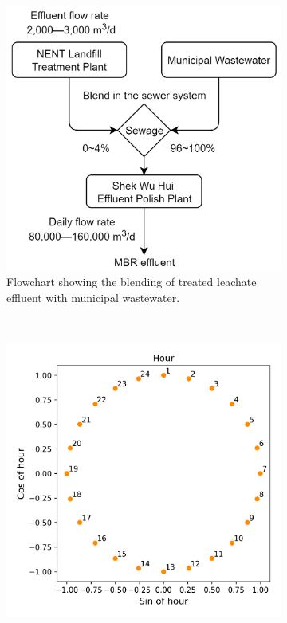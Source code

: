\begin{figure}[!ht]
    \centering
    \hspace{2em}
    \begin{subfigure}[t]{0.7\textwidth}
      \includegraphics[width=\linewidth]{imgs/pre-processing/blending-ratio.png}
      \caption{Flowchart showing the blending of treated leachate effluent with municipal wastewater.} \label{fig:blend-ratio}
    \end{subfigure}\\
    \begin{subfigure}[t]{0.5\textwidth}
      \includegraphics[width=\linewidth]{imgs/pre-processing/pos-encoding.png}

\end{subfigure}
\end{figure}
